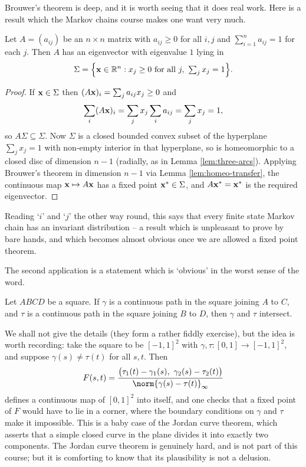 \documentclass[a4paper]{scrartcl}
\begin{document}
Brouwer's theorem is deep, and it is worth seeing that it does real work. Here is a result which the Markov chains course makes one want very much.

\begin{proposition}\label{prop:perron}
	Let $A = (a_{ij})$ be an $n\times n$ matrix with $a_{ij}\geq 0$ for all $i,j$ and $\sum_{i=1}^n a_{ij} = 1$ for each $j$. Then $A$ has an eigenvector with eigenvalue $1$ lying in
	$$\Sigma = \Big\{\mathbf{x} \in \mathbb{R}^n : x_j \geq 0 \text{ for all } j, \ \textstyle\sum_j x_j = 1\Big\}.$$
\end{proposition}

\begin{proof}
	If $\mathbf{x} \in \Sigma$ then $(A\mathbf{x})_i = \sum_j a_{ij}x_j \geq 0$ and
	$$\sum_i (A\mathbf{x})_i = \sum_j x_j \sum_i a_{ij} = \sum_j x_j = 1,$$
	so $A\Sigma \subseteq \Sigma$. Now $\Sigma$ is a closed bounded convex subset of the hyperplane $\sum_j x_j = 1$ with non-empty interior in that hyperplane, so is homeomorphic to a closed disc of dimension $n-1$ (radially, as in Lemma \ref{lem:three-arcs}). Applying Brouwer's theorem in dimension $n-1$ via Lemma \ref{lem:homeo-transfer}, the continuous map $\mathbf{x}\mapsto A\mathbf{x}$ has a fixed point $\mathbf{x}^* \in \Sigma$, and $A\mathbf{x}^* = \mathbf{x}^*$ is the required eigenvector.
\end{proof}

Reading `$i$' and `$j$' the other way round, this says that every finite state Markov chain has an invariant distribution -- a result which is unpleasant to prove by bare hands, and which becomes almost obvious once we are allowed a fixed point theorem.

The second application is a statement which is `obvious' in the worst sense of the word.

\begin{proposition}\label{prop:crossing}
	Let $ABCD$ be a square. If $\gamma$ is a continuous path in the square joining $A$ to $C$, and $\tau$ is a continuous path in the square joining $B$ to $D$, then $\gamma$ and $\tau$ intersect.
\end{proposition}

We shall not give the details (they form a rather fiddly exercise), but the idea is worth recording: take the square to be $[-1,1]^2$ with $\gamma, \tau : [0,1] \to [-1,1]^2$, and suppose $\gamma(s) \neq \tau(t)$ for all $s,t$. Then
$$F(s,t) = \frac{\big(\tau_1(t)-\gamma_1(s),\ \gamma_2(s)-\tau_2(t)\big)}{\norm{\gamma(s)-\tau(t)}_\infty}$$
defines a continuous map of $[0,1]^2$ into itself, and one checks that a fixed point of $F$ would have to lie in a corner, where the boundary conditions on $\gamma$ and $\tau$ make it impossible. This is a baby case of the Jordan curve theorem, which asserts that a simple closed curve in the plane divides it into exactly two components. The Jordan curve theorem is genuinely hard, and is not part of this course; but it is comforting to know that its plausibility is not a delusion.
\end{document}

